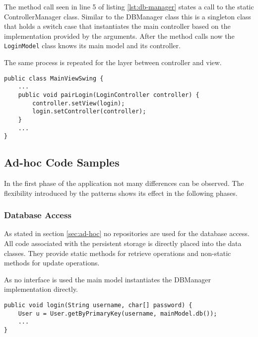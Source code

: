 The method call seen in line 5 of listing \ref{lst:db-manager} states a call to the static ControllerManager class. Similar to the DBManager class this is a singleton class that holds a switch case that instantiates the main controller based on the implementation provided by the arguments. After the method calls now the \texttt{LoginModel} class knows its main model and its controller. 

\clearpage

The same process is repeated for the layer between controller and view. 

\begin{lstlisting}[caption={Code snipped showing pairing code between a sub-controller and a sub-view. The pairing between the model and controller layer works in a very similar way.}, captionpos=b, label={lst:pairing}]
public class MainViewSwing {
	...
	public void pairLogin(LoginController controller) {
		controller.setView(login);
		login.setController(controller);
	}
	...
}
\end{lstlisting}
   
\subsection{Ad-hoc Code Samples}
In the first phase of the application not many differences can be observed. The flexibility introduced by the patterns shows its effect in the following phases. 

\subsubsection{Database Access}
As stated in section \ref{sec:ad-hoc} no repositories are used for the database access. All code associated with the persistent storage is directly placed into the data classes. They provide static methods for retrieve operations and non-static methods for update operations. 

As no interface is used the main model instantiates the DBManager implementation directly. 

\begin{lstlisting}[caption={Code snipped showing database access in the ad-hoc program version. All database code is placed into the corresponding data class, retrieval methods are static and take the corresponding DBManager as parameter. The reference to the DBManager is provided by a getter method of the main model, as in listing \ref{lst:db-access-bp}.}, captionpos=b]
public void login(String username, char[] password) {
	User u = User.getByPrimaryKey(username, mainModel.db()); 
	...
}
\end{lstlisting}

